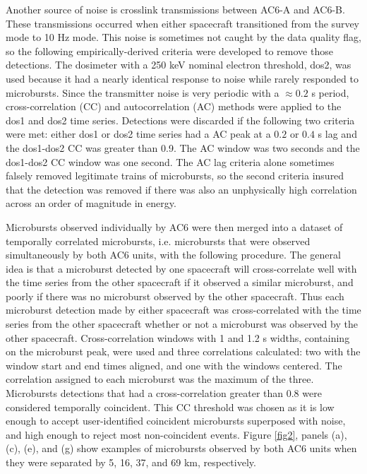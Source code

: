 \documentclass[draft]{agujournal2019}
\begin{document}
Another source of noise is crosslink transmissions between AC6-A and AC6-B. These transmissions occurred when either spacecraft transitioned from the survey mode to 10 Hz mode. This noise is sometimes not caught by the data quality flag, so the following empirically-derived criteria were developed to remove those detections. The dosimeter with a 250 keV nominal electron threshold, dos2, was used because it had a nearly identical response to noise while rarely responded to microbursts. Since the transmitter noise is very periodic with a $\approx 0.2$ s period, cross-correlation (CC) and autocorrelation (AC) methods were applied to the dos1 and dos2 time series. Detections were discarded if the following two criteria were met: either dos1 or dos2 time series had a AC peak at a $0.2$ or $0.4$ s lag and the dos1-dos2 CC was greater than 0.9. The AC window was two seconds and the dos1-dos2 CC window was one second. The AC lag criteria alone sometimes falsely removed legitimate trains of microbursts, so the second criteria insured that the detection was removed if there was also an unphysically high correlation across an order of magnitude in energy.

Microbursts observed individually by AC6 were then merged into a dataset of temporally correlated microbursts, i.e. microbursts that were observed simultaneously by both AC6 units, with the following procedure. The general idea is that a microburst detected by one spacecraft will cross-correlate well with the time series from the other spacecraft if it observed a similar microburst, and poorly if there was no microburst observed by the other spacecraft. Thus each microburst detection made by either spacecraft was cross-correlated with the time series from the other spacecraft whether or not a microburst was observed by the other spacecraft. Cross-correlation windows with 1 and 1.2 s widths, containing on the microburst peak, were used and three correlations calculated: two with the window start and end times aligned, and one with the windows centered. The correlation assigned to each microburst was the maximum of the three. Microbursts detections that had a cross-correlation greater than $0.8$ were considered temporally coincident. This CC threshold was chosen as it is low enough to accept user-identified coincident microbursts superposed with noise, and high enough to reject most non-coincident events. Figure \ref{fig2}, panels (a), (c), (e), and (g) show examples of microbursts observed by both AC6 units when they were separated by 5, 16, 37, and 69 km, respectively. 
\end{document}
